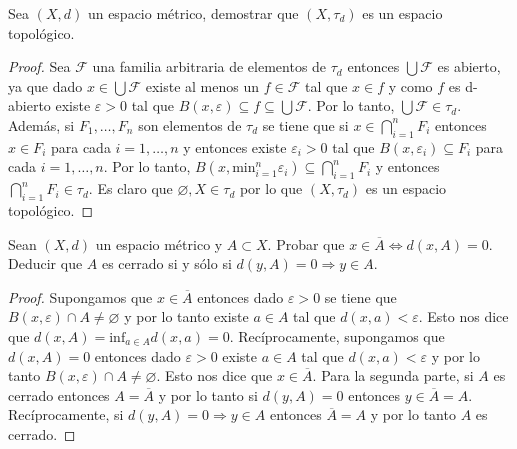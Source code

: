 \documentclass{article}
\theoremstyle{definition}
\newcommand{\cl}[1]{\overline{#1}}              %
\newenvironment{ejercicio}[1]{\begin{trivlist}
\item[\hskip \labelsep {\bfseries Ejercicio}\hskip \labelsep {\bfseries #1.}]}{\end{trivlist}}
\begin{document}
\begin{ejercicio}{4}
    Sea \((X, d)\) un espacio métrico, demostrar que \((X,\tau_{d})\) es un espacio topológico.
\end{ejercicio}
\begin{proof}
    Sea \( \mathcal{F} \) una familia arbitraria de elementos de \( \tau_d \) entonces \( \bigcup \mathcal{F} \) es abierto, ya que dado \( x \in \bigcup \mathcal{F} \) existe al menos un \( f \in \mathcal{F} \) tal que \( x \in f \) y como
    \( f \) es d-abierto existe \( \varepsilon > 0 \) tal que \( B(x, \varepsilon) \subseteq f \subseteq \bigcup \mathcal{F} \). Por lo tanto, \( \bigcup \mathcal{F} \in \tau_d \).
    Además, si \( F_1, \ldots, F_n \) son elementos de \( \tau_d \) se tiene que si \( x \in \bigcap_{i = 1}^n F_i \) entonces \( x \in F_i \) para cada \( i = 1, \ldots, n\) y
    entonces existe \( \varepsilon_i > 0 \) tal que \( B(x, \varepsilon_i) \subseteq F_i \) para cada \( i = 1, \ldots, n\). Por lo tanto, \( B(x, \text{min}_{i = 1}^n \varepsilon_i) \subseteq \bigcap_{i = 1}^n F_i \) y entonces \( \bigcap_{i = 1}^n F_i \in \tau_d \).
    Es claro que \( \varnothing, X \in \tau_d \) por lo que \( (X, \tau_d) \) es un espacio topológico.
\end{proof}

\begin{ejercicio}{5}
    Sean \((X, d)\) un espacio métrico y \(A\subset X\). Probar que \(x\in\cl{A}\iff d(x,A)=0\). Deducir que \(A\) es cerrado si y sólo si \(d(y,A)=0\Rightarrow y\in A\).
\end{ejercicio}
\begin{proof}
    Supongamos que \( x \in \cl{A} \) entonces dado \( \varepsilon > 0 \) se tiene que \( B(x, \varepsilon) \cap A \neq \varnothing \) y por lo tanto existe \( a \in A \) tal que \( d(x, a) < \varepsilon \). Esto nos dice que \( d(x, A) = \text{inf}_{a \in A} d(x, a) = 0 \).
    Recíprocamente, supongamos que \( d(x, A) = 0 \) entonces dado \( \varepsilon > 0 \) existe \( a \in A \) tal que \( d(x, a) < \varepsilon \) y por lo tanto \( B(x, \varepsilon) \cap A \neq \varnothing \). Esto nos dice que \( x \in \cl{A} \).
    Para la segunda parte, si \( A \) es cerrado entonces \( A = \cl{A} \) y por lo tanto si \( d(y, A) = 0 \) entonces \( y \in \cl{A} = A \). Recíprocamente, si \( d(y, A) = 0 \Rightarrow y \in A \) entonces \( \cl{A} = A \) y por lo tanto \( A \) es cerrado.
\end{proof}
\end{document}
